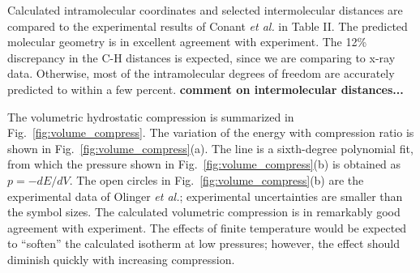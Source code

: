 \documentclass[prb,aps,nobibnotes,twocolumn,doublespace,twocolumngrid,superbib]{revtex4}
\begin{document}
Calculated intramolecular coordinates and selected intermolecular
distances are compared to the experimental results of Conant {\it et al.}\/ in 
Table II.  The predicted molecular geometry is in excellent agreement
with experiment.  The 12\% discrepancy in the C-H distances is expected,
since we are comparing to x-ray data.  Otherwise, most of the intramolecular
degrees of freedom are accurately predicted to within a few percent.
{\bf comment on intermolecular distances...}

The volumetric hydrostatic compression is summarized in 
Fig.~\ref{fig:volume_compress}.  The 
variation of the energy with compression ratio is shown in 
Fig.~\ref{fig:volume_compress}(a).
The line is a sixth-degree polynomial fit, from which the pressure
shown in Fig.~\ref{fig:volume_compress}(b) is obtained as $p=-dE/dV$.  
The open circles in Fig.~\ref{fig:volume_compress}(b) 
are the experimental data of Olinger {\it et al.}; experimental uncertainties
are smaller than the symbol sizes.  The calculated volumetric compression
is in remarkably good agreement with experiment.  The effects of finite 
temperature would be expected to ``soften'' the calculated 
isotherm at low pressures; however, the effect should
diminish quickly with increasing compression.
\end{document}
